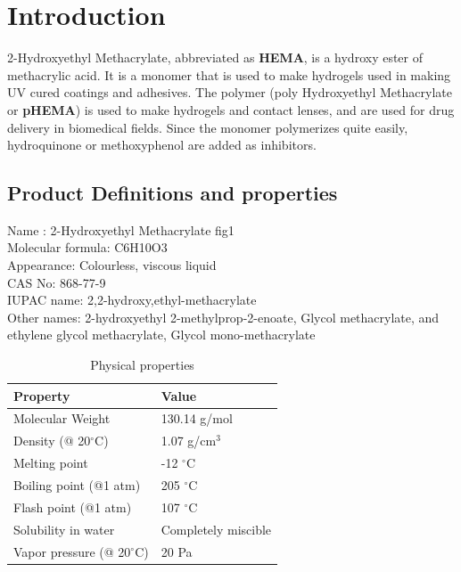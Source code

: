\documentclass[12pt,a4paper]{report}
\begin{document}
	
	\tableofcontents
	\newpage
	\listoffigures
	\newpage

\chapter{Introduction}
2-Hydroxyethyl Methacrylate, abbreviated as \textbf{HEMA}, is a hydroxy ester of methacrylic acid. It
is a monomer that is used to make hydrogels used in making UV cured coatings and adhesives.
The polymer (poly Hydroxyethyl Methacrylate or \textbf{pHEMA}) is used to make hydrogels and
contact lenses, and are used for drug delivery in biomedical fields. Since the monomer
polymerizes quite easily, hydroquinone or methoxyphenol are added as inhibitors.

\section{Product Definitions and properties}
Name : 2-Hydroxyethyl Methacrylate
fig1
\\ Molecular formula: C6H10O3
\\ Appearance: Colourless, viscous liquid
\\ CAS No: 868-77-9
\\ IUPAC name: 2,2-hydroxy,ethyl-methacrylate
\\ Other names: 2-hydroxyethyl 2-methylprop-2-enoate, Glycol methacrylate, and ethylene glycol
methacrylate, Glycol mono-methacrylate

\begin{table}[h]
	\centering
	\renewcommand{\arraystretch}{1.5}
	\begin{tabular}{|l|l|}
		\hline
		\textbf{Property} & \textbf{Value} \\
		\hline
		Molecular Weight & 130.14 g/mol \\
		\hline
		Density (@ 20$^\circ$C) & 1.07 g/cm$^3$ \\
		\hline
		Melting point & -12 $^\circ$C \\
		\hline
		Boiling point (@1 atm) & 205 $^\circ$C \\
		\hline
		Flash point (@1 atm) & 107 $^\circ$C \\
		\hline
		Solubility in water & Completely miscible \\
		\hline
		Vapor pressure (@ 20$^\circ$C) & 20 Pa \\
		\hline
	\end{tabular}
	\caption{Physical properties}
	\label{tab:hysteresis}
\end{table}
\end{document}

